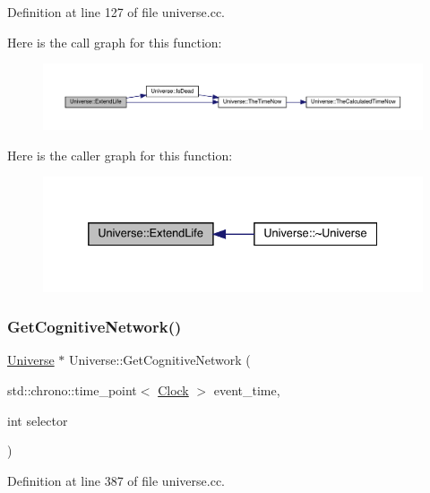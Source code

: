 Definition at line 127 of file universe.\+cc.

Here is the call graph for this function\+:
\nopagebreak
\begin{figure}[H]
\begin{center}
\leavevmode
\includegraphics[width=350pt]{class_universe_a982502e46868a00a9111738ccc9355c2_cgraph}
\end{center}
\end{figure}
Here is the caller graph for this function\+:
\nopagebreak
\begin{figure}[H]
\begin{center}
\leavevmode
\includegraphics[width=332pt]{class_universe_a982502e46868a00a9111738ccc9355c2_icgraph}
\end{center}
\end{figure}
\mbox{\label{class_universe_a1ea2b7e438bfdc7dd599aa59c310b126}} 
\subsubsection{\texorpdfstring{Get\+Cognitive\+Network()}{GetCognitiveNetwork()}}
{\footnotesize\ttfamily \hyperlink{class_universe}{Universe} $\ast$ Universe\+::\+Get\+Cognitive\+Network (\begin{DoxyParamCaption}\item[{std\+::chrono\+::time\+\_\+point$<$ \hyperlink{universe_8h_a0ef8d951d1ca5ab3cfaf7ab4c7a6fd80}{Clock} $>$}]{event\+\_\+time,  }\item[{int}]{selector }\end{DoxyParamCaption})}



Definition at line 387 of file universe.\+cc.


